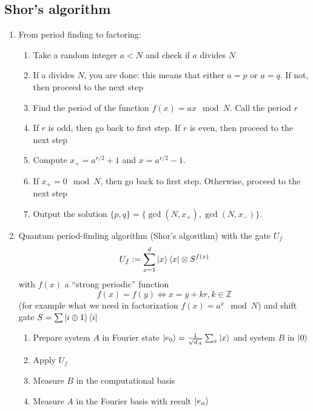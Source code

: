 \documentclass[11pt,a4paper]{article}%
\numberwithin{equation}{section}
\begin{document}
\subsection{Shor's algorithm} %
\label{sub:shors_algorithm}
\begin{enumerate}
    \item From period finding to factoring:
    \begin{enumerate}
        \item Take a random integer $a < N$ and check if $a$ divides $N$\label{algo_rda}
        \item If a divides $N$, you are done: this means that either $a = p$ or $a = q$. If not, then proceed to the next step
        \item Find the period of the function $f(x) = ax \mod N$. Call the period $r$
        \item If $r$ is odd, then go back to first step. If $r$ is even, then proceed to the next step
        \item Compute $x_+ = a^{r/2} + 1$ and $x = a^{r/2} - 1$.
        \item If $x_+ = 0 \mod N$, then go back to first step. Otherwise, proceed to the next step
        \item Output the solution $\{p, q\} = \{\operatorname{gcd}(N,x_+),\operatorname{gcd}(N,x_-)\}$.
    \end{enumerate}
    \item Quantum period-finding algorithm (Shor's algorithm) with the gate $U_f$
        \begin{equation}
            U_f := \sum_{x=1}^{d}\ket x\bra x\otimes S^{f(x)}
        \end{equation}
        with $f(x)$ a ``strong periodic'' function
        \begin{equation}
            f(x) = f(y) \Longleftrightarrow x = y+kr,k\in\mathbb Z
        \end{equation}
        (for example what we need in factorization $f(x) = a^x\mod N$) and shift gate $S = \sum\ket{i\oplus 1}\bra{i}$
    \begin{enumerate}
        \item Prepare system $A$ in Fourier state $\ket{e_0} = \frac 1{\sqrt{d_A}}\sum_x\ket x$ and system $B$ in $\ket0$
        \item Apply $U_f$
        \item Measure $B$ in the computational basis
        \item Measure $A$ in the Fourier basis with result $\ket{e_n}$

\end{enumerate}
\end{enumerate}
\end{document}
